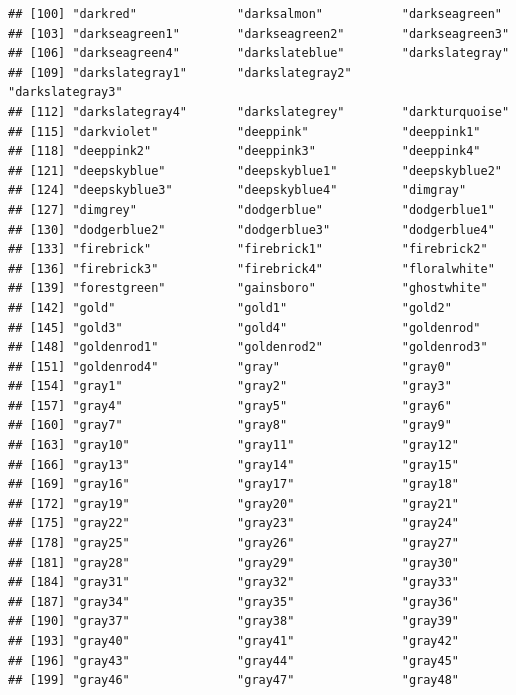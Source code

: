 \documentclass[
]{article}
\begin{document}
\begin{verbatim}
## [100] "darkred"              "darksalmon"           "darkseagreen"        
## [103] "darkseagreen1"        "darkseagreen2"        "darkseagreen3"       
## [106] "darkseagreen4"        "darkslateblue"        "darkslategray"       
## [109] "darkslategray1"       "darkslategray2"       "darkslategray3"      
## [112] "darkslategray4"       "darkslategrey"        "darkturquoise"       
## [115] "darkviolet"           "deeppink"             "deeppink1"           
## [118] "deeppink2"            "deeppink3"            "deeppink4"           
## [121] "deepskyblue"          "deepskyblue1"         "deepskyblue2"        
## [124] "deepskyblue3"         "deepskyblue4"         "dimgray"             
## [127] "dimgrey"              "dodgerblue"           "dodgerblue1"         
## [130] "dodgerblue2"          "dodgerblue3"          "dodgerblue4"         
## [133] "firebrick"            "firebrick1"           "firebrick2"          
## [136] "firebrick3"           "firebrick4"           "floralwhite"         
## [139] "forestgreen"          "gainsboro"            "ghostwhite"          
## [142] "gold"                 "gold1"                "gold2"               
## [145] "gold3"                "gold4"                "goldenrod"           
## [148] "goldenrod1"           "goldenrod2"           "goldenrod3"          
## [151] "goldenrod4"           "gray"                 "gray0"               
## [154] "gray1"                "gray2"                "gray3"               
## [157] "gray4"                "gray5"                "gray6"               
## [160] "gray7"                "gray8"                "gray9"               
## [163] "gray10"               "gray11"               "gray12"              
## [166] "gray13"               "gray14"               "gray15"              
## [169] "gray16"               "gray17"               "gray18"              
## [172] "gray19"               "gray20"               "gray21"              
## [175] "gray22"               "gray23"               "gray24"              
## [178] "gray25"               "gray26"               "gray27"              
## [181] "gray28"               "gray29"               "gray30"              
## [184] "gray31"               "gray32"               "gray33"              
## [187] "gray34"               "gray35"               "gray36"              
## [190] "gray37"               "gray38"               "gray39"              
## [193] "gray40"               "gray41"               "gray42"              
## [196] "gray43"               "gray44"               "gray45"              
## [199] "gray46"               "gray47"               "gray48"              

\end{verbatim}
\end{document}
